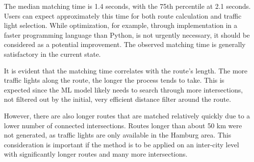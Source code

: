 The median matching time is 1.4 seconds, with the 75th percentile at 2.1 seconds. Users can expect approximately this time for both route calculation and traffic light selection. While optimization, for example, through implementation in a faster programming language than Python, is not urgently necessary, it should be considered as a potential improvement. The observed matching time is generally satisfactory in the current state.

It is evident that the matching time correlates with the route's length. The more traffic lights along the route, the longer the process tends to take. This is expected since the ML model likely needs to search through more intersections, not filtered out by the initial, very efficient distance filter around the route.

However, there are also longer routes that are matched relatively quickly due to a lower number of connected intersections. Routes longer than about 50 km were not generated, as traffic lights are only available in the Hamburg area. This consideration is important if the method is to be applied on an inter-city level with significantly longer routes and many more intersections.

